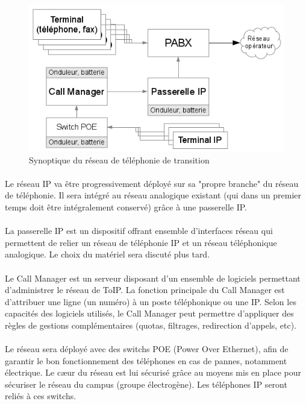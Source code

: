 \begin{figure}[h]
  \caption{\label{synoptique_transition} Synoptique du réseau de téléphonie de
    transition}
  \includegraphics{Transition.png}
\end{figure}

\paragraph{} Le réseau IP va être progressivement déployé sur sa "propre
branche" du réseau de téléphonie. Il sera intégré au réseau analogique existant
(qui dans un premier temps doit être intégralement conservé) grâce à une
passerelle IP.

\paragraph{} La passerelle IP est un dispositif offrant ensemble d'interfaces
réseau qui permettent de relier un réseau de téléphonie IP et un réseau
téléphonique analogique. Le choix du matériel sera discuté plus tard.

\paragraph{} Le Call Manager est un serveur disposant d'un ensemble de logiciels
permettant d'administrer le réseau de ToIP. La fonction principale du Call
Manager est d'attribuer une ligne (un numéro) à un poste téléphonique ou une IP.
Selon les capacités des logiciels utilisés, le Call Manager peut permettre
d'appliquer des règles de gestions complémentaires (quotas, filtrages,
redirection d'appels, etc).

\paragraph{} Le réseau sera déployé avec des switchs POE (Power Over Ethernet),
afin de garantir le bon fonctionnement des téléphones en cas de pannes,
notamment électrique. Le cæur du réseau est lui sécurisé grâce au moyens
mis en place pour sécuriser le réseau du campus (groupe électrogène). Les
téléphones IP seront reliés à ces switchs.

